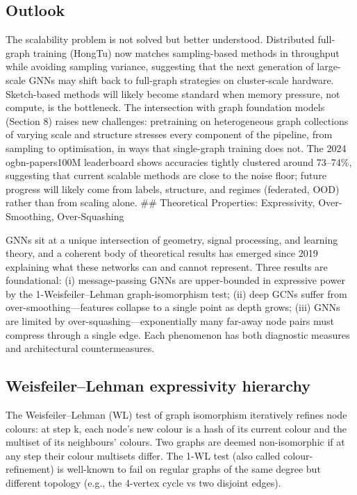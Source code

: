 \subsection{Outlook}\label{outlook-1}

The scalability problem is not solved but better understood. Distributed full-graph training (HongTu) now matches sampling-based methods in throughput while avoiding sampling variance, suggesting that the next generation of large-scale GNNs may shift back to full-graph strategies on cluster-scale hardware. Sketch-based methods will likely become standard when memory pressure, not compute, is the bottleneck. The intersection with graph foundation models (Section 8) raises new challenges: pretraining on heterogeneous graph collections of varying scale and structure stresses every component of the pipeline, from sampling to optimisation, in ways that single-graph training does not. The 2024 ogbn-papers100M leaderboard shows accuracies tightly clustered around 73--74\%, suggesting that current scalable methods are close to the noise floor; future progress will likely come from labels, structure, and regimes (federated, OOD) rather than from scaling alone.
\#\# Theoretical Properties: Expressivity, Over-Smoothing, Over-Squashing

GNNs sit at a unique intersection of geometry, signal processing, and learning theory, and a coherent body of theoretical results has emerged since 2019 explaining what these networks can and cannot represent. Three results are foundational: (i) message-passing GNNs are upper-bounded in expressive power by the 1-Weisfeiler--Lehman graph-isomorphism test; (ii) deep GCNs suffer from over-smoothing---features collapse to a single point as depth grows; (iii) GNNs are limited by over-squashing---exponentially many far-away node pairs must compress through a single edge. Each phenomenon has both diagnostic measures and architectural countermeasures.

\subsection{Weisfeiler--Lehman expressivity hierarchy}\label{weisfeilerlehman-expressivity-hierarchy}

The Weisfeiler--Lehman (WL) test of graph isomorphism iteratively refines node colours: at step k, each node's new colour is a hash of its current colour and the multiset of its neighbours' colours. Two graphs are deemed non-isomorphic if at any step their colour multisets differ. The 1-WL test (also called colour-refinement) is well-known to fail on regular graphs of the same degree but different topology (e.g., the 4-vertex cycle vs two disjoint edges).

